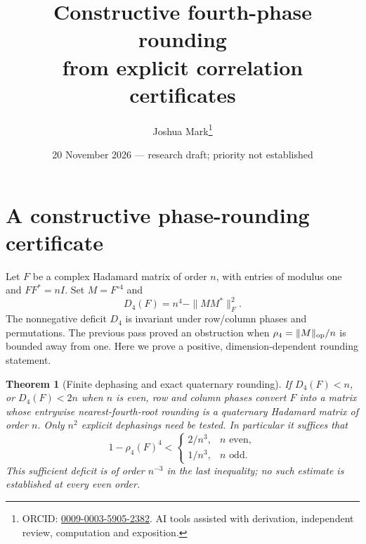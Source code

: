 \documentclass[11pt]{article}
\title{Constructive fourth-phase rounding\\from explicit correlation certificates}
\author{Joshua Mark\thanks{ORCID: \href{https://orcid.org/0009-0003-5905-2382}{0009-0003-5905-2382}. AI tools assisted with derivation, independent review, computation and exposition.}}
\date{20 November 2026 --- research draft; priority not established}
\newtheorem{theorem}{Theorem}[section]
\begin{document}
\maketitle
\section{A constructive phase-rounding certificate}
Let $F$ be a complex Hadamard matrix of order $n$, with entries of
modulus one and $FF^*=nI$. Set $M=F^{\circ4}$ and
\[
 D_4(F)=n^4-\|MM^*\|_F^2.
\]
The nonnegative deficit $D_4$ is invariant under row/column phases
and permutations. The previous pass proved an obstruction when
$\rho_4=\|M\|_{\rm op}/n$ is bounded away from one. Here we prove a
positive, dimension-dependent rounding statement.

\begin{theorem}[Finite dephasing and exact quaternary rounding]
\label{thm:phase-rounding}
If $D_4(F)<n$, or $D_4(F)<2n$ when $n$ is even,
row and column phases convert $F$ into
a matrix whose entrywise nearest-fourth-root rounding is a
quaternary Hadamard matrix of order $n$.
Only $n^2$ explicit dephasings need be tested.
In particular it suffices that
\[
 1-\rho_4(F)^4<
 \begin{cases}2/n^3,& n\text{ even},\\1/n^3,&n\text{ odd}.\end{cases}
\]
This sufficient deficit is of order $n^{-3}$ in the last inequality;
no such estimate is established at every even order.
\end{theorem}
\end{document}
